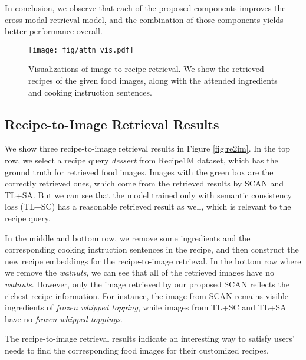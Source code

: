 \documentclass[journal]{IEEEtran}
\begin{document}
In conclusion, we observe that each of the proposed components improves the cross-modal retrieval model, and the combination of those components yields better performance overall. 

\begin{figure*}[h!]
\begin{center}
\texttt{[image: fig/attn\_vis.pdf]}
\end{center}
   \caption{Visualizations of image-to-recipe retrieval. We show the retrieved recipes of the given food images, along with the attended ingredients and cooking instruction sentences.}
\label{fig:attn_vis}
\end{figure*}

\subsection{Recipe-to-Image Retrieval Results}
We show three recipe-to-image retrieval results in Figure \ref{fig:re2im}. In the top row, we select a recipe query \emph{dessert} from Recipe1M dataset, which has the ground truth for retrieved food images. Images with the green box are the correctly retrieved ones, which come from the retrieved results by SCAN and TL+SA. But we can see that the model trained only with semantic consistency loss (TL+SC) has a reasonable retrieved result as well, which is relevant to the recipe query.

In the middle and bottom row, we remove some ingredients and the corresponding cooking instruction sentences in the recipe, and then construct the new recipe embeddings for the recipe-to-image retrieval. In the bottom row where we remove the \emph{walnuts}, we can see that all of the retrieved images have no \emph{walnuts}. However, only the image retrieved by our proposed SCAN reflects the richest recipe information. For instance, the image from SCAN remains visible ingredients of \emph{frozen whipped topping}, while images from TL+SC and TL+SA have no \emph{frozen whipped toppings}. 

The recipe-to-image retrieval results indicate an interesting way to satisfy users' needs to find the corresponding food images for their customized recipes.
\end{document}
